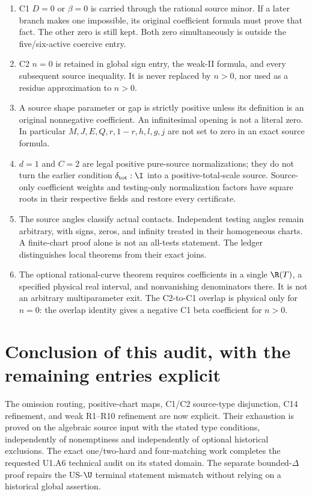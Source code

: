 \begin{enumerate}
\item C1 $D=0$ or $\beta=0$ is carried through the rational source
minor. If a later branch makes one impossible, its original coefficient
formula must prove that fact. The other zero is still kept. Both zero
simultaneously is outside the five/six-active coercive entry.
\item C2 $n=0$ is retained in global sign entry, the weak-II formula,
and every subsequent source inequality. It is never replaced by
$n>0$, nor used as a residue approximation to $n>0$.
\item A source shape parameter or gap is strictly positive unless its
definition is an original nonnegative coefficient. An infinitesimal
opening is not a literal zero. In particular $M,J,E,Q,r,1-r,h,l,g,j$
are not set to zero in an exact source formula.
\item $d=1$ and $C=2$ are legal positive pure-source normalizations;
they do not turn the earlier condition $\delta_{\rm tot}:\I$ into
a positive-total-scale source. Source-only coefficient weights and
testing-only normalization factors have square roots in their respective
fields and restore every certificate.
\item The source angles classify actual contacts. Independent testing
angles remain arbitrary, with signs, zeros, and infinity treated in their
homogeneous charts. A finite-chart proof alone is not an all-tests
statement. The ledger distinguishes local theorems from their exact joins.
\item The optional rational-curve theorem requires coefficients in a
single $\R(T)$, a specified physical real interval, and nonvanishing
denominators there. It is not an arbitrary multiparameter exit.
The C2-to-C1 overlap is physical only for $n=0$: the overlap identity
gives a negative C1 beta coefficient for $n>0$.
\end{enumerate}

\section{Conclusion of this audit, with the remaining entries explicit}

The omission routing, positive-chart maps, C1/C2 source-type disjunction,
C14 refinement, and weak R1--R10 refinement are now explicit. Their
exhaustion is proved on the algebraic source input with the stated type
conditions, independently of nonemptiness and independently of optional
historical exclusions. The exact one/two-hard and four-matching work
completes the requested U1.A6 technical audit on its stated domain.
The separate bounded-$\Delta$ proof repairs the US-$\U$ terminal
statement mismatch without relying on a historical global assertion.

